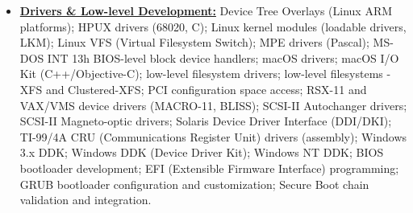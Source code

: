 \documentclass[letterpaper,11pt]{article}
\begin{document}
\begin{multicols}{3}
{\begin{itemize}[leftmargin=0.1in, label={}, itemsep=0pt, parsep=0pt, topsep=0pt, partopsep=0pt]
\item
    \textbf{\uline{Drivers \& Low-level Development:}} \hspace{0pt}
    Device Tree Overlays (Linux ARM platforms);
    HPUX drivers (68020, C);
    Linux kernel modules (loadable drivers, LKM);
    Linux VFS (Virtual Filesystem Switch);
    MPE drivers (Pascal);
    MS-DOS INT 13h BIOS-level block device handlers;
    macOS drivers;
    macOS I/O Kit (C++/Objective-C);
    low-level filesystem drivers;
    low-level filesystems - XFS and Clustered-XFS;
    PCI configuration space access;
    RSX-11 and VAX/VMS device drivers (MACRO-11, BLISS);
    SCSI-II Autochanger drivers;
    SCSI-II Magneto-optic drivers;
    Solaris Device Driver Interface (DDI/DKI);
    TI-99/4A CRU (Communications Register Unit) drivers (assembly);
    Windows 3.x DDK;
    Windows DDK (Device Driver Kit);
    Windows NT DDK;
    BIOS bootloader development;
    EFI (Extensible Firmware Interface) programming;
    GRUB bootloader configuration and customization;
    Secure Boot chain validation and integration.


\end{itemize}}
\end{multicols}
\end{document}
